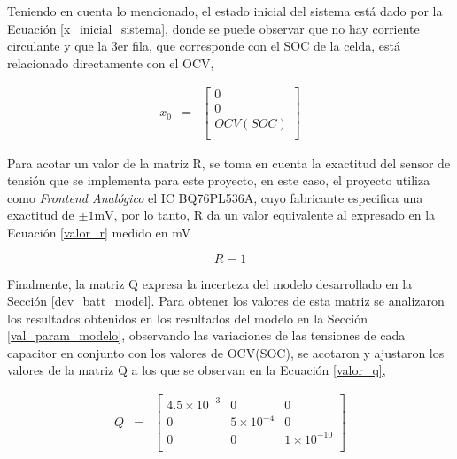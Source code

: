 \documentclass[10pt, a4paper]{report}
\begin{document}
Teniendo en cuenta lo mencionado, el estado inicial del sistema est\'a dado por
la Ecuaci\'on \ref{x_inicial_sistema}, donde se puede observar que no hay
corriente circulante y que la 3er fila, que corresponde con el \acrshort{SOC} de
la celda, est\'a relacionado directamente con el \acrshort{OCV},

\begin{equation}
    \begin{array}{llll}
	x_0 & = & \begin{bmatrix}
	    0 \\
	    0 \\
        OCV(SOC) \\
	\end{bmatrix} 
    \end{array} \label{x_inicial_sistema}
\end{equation}

Para acotar un valor de la matriz R, se toma en cuenta la exactitud del sensor
de tensi\'on que se implementa para este proyecto, en este caso, el proyecto
utiliza como \emph{Frontend Anal\'ogico} el \acrshort{IC} BQ76PL536A, cuyo
fabricante especifica una exactitud de $\mathrm{\pm 1mV}$, por lo tanto, R da un 
valor equivalente al expresado en la Ecuaci\'on \ref{valor_r} medido en mV

\begin{equation}
    R = 1  \label{valor_r}
\end{equation}

Finalmente, la matriz Q expresa la incerteza del modelo desarrollado en la 
Secci\'on \ref{dev_batt_model}. Para obtener los valores de esta matriz se
analizaron los resultados obtenidos en los resultados del modelo en la Secci\'on 
\ref{val_param_modelo}, observando las variaciones de las tensiones de cada
capacitor en conjunto con los valores de \acrshort{OCV}(SOC), se acotaron y
ajustaron los valores de la matriz Q a los que se observan en la Ecuaci\'on
\ref{valor_q},

\begin{equation}
    \begin{array}{llll}
	Q & = & \begin{bmatrix}
	    4.5\times10^{-3} & 0 & 0 \\
	    0 & 5\times10^{-4} & 0 \\
	    0 & 0 & 1\times10^{-10} \\
	\end{bmatrix} 
    \end{array} \nonumber
    \label{valor_q}
\end{equation}
\end{document}
